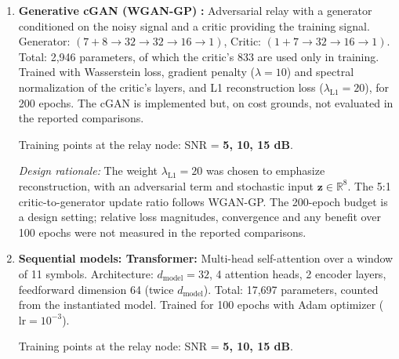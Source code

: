 \begin{enumerate}
  \emph{Implementation:} Hidden layers use ReLU. Training samples $z=\mu+\exp(\log\sigma^2/2)\epsilon$, $\epsilon\sim\mathcal N(0,I)$; evaluation instead decodes $z=\mu$ deterministically. MSE is averaged over batch outputs and KL over batch and latent coordinates, with weight $\beta=0.1$. Thus the latent dimension does not multiply the stated KL weight.
\item  \textbf{Generative cGAN (WGAN-GP)} \cite{MirzaOsindero2014cGAN,Gulrajani2017WGANgp}\textbf{:} Adversarial relay with a generator conditioned on the noisy signal and a critic providing the training signal. Generator: \((7+8 \to 32 \to 32 \to 16 \to 1)\), Critic: \((1+7 \to 32 \to 16 \to 1)\). Total: 2,946 parameters, of which the critic's 833 are used only in training. Trained with Wasserstein loss, gradient penalty (\(\lambda=10\)) and spectral normalization of the critic's layers, and L1 reconstruction loss (\(\lambda_{\text{L1}}=20\)), for 200 epochs. The cGAN is implemented but, on cost grounds, not evaluated in the reported comparisons.

  Training points at the relay node: SNR = \textbf{5, 10, 15 dB}.

  \emph{Design rationale:} The weight \(\lambda_{\text{L1}} = 20\) was chosen to emphasize reconstruction, with an adversarial term and stochastic input \(\mathbf z\in\mathbb R^8\). The 5:1 critic-to-generator update ratio follows WGAN-GP. The 200-epoch budget is a design setting; relative loss magnitudes, convergence and any benefit over 100 epochs were not measured in the reported comparisons.

\item  \textbf{Sequential models: Transformer:} Multi-head self-attention over a window of 11 symbols. Architecture: \(d_{\text{model}}=32\), 4 attention heads, 2 encoder layers, feedforward dimension 64 (twice \(d_{\text{model}}\)). Total: 17,697 parameters, counted from the instantiated model. Trained for 100 epochs with Adam optimizer (\(\text{lr}=10^{-3}\)).

  Training points at the relay node: SNR = \textbf{5, 10, 15 dB}.


\end{enumerate}
